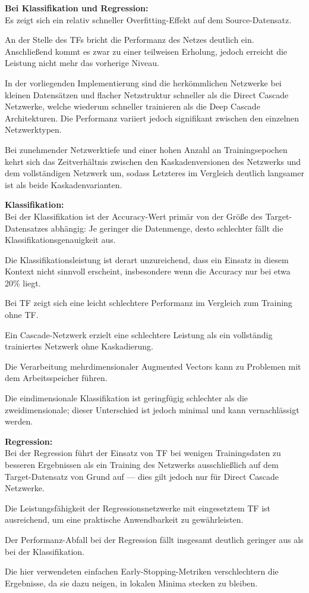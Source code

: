 \textbf{Bei Klassifikation und Regression:}\\
Es zeigt sich ein relativ schneller Overfitting-Effekt auf dem Source-Datensatz.

An der Stelle des TFs bricht die Performanz des Netzes deutlich ein. Anschließend kommt es zwar zu einer teilweisen Erholung, 
jedoch erreicht die Leistung nicht mehr das vorherige Niveau.

In der vorliegenden Implementierung sind die herkömmlichen Netzwerke bei kleinen Datensätzen und flacher Netzstruktur schneller als die Direct 
Cascade Netzwerke, welche wiederum schneller trainieren als die Deep Cascade Architekturen. Die Performanz variiert jedoch signifikant 
zwischen den einzelnen Netzwerktypen. 

Bei zunehmender Netzwerktiefe und einer hohen Anzahl an Trainingsepochen kehrt sich das Zeitverhältnis zwischen den Kaskadenversionen des 
Netzwerks und dem vollständigen Netzwerk um, sodass Letzteres im Vergleich deutlich langsamer ist als beide Kaskadenvarianten.

\textbf{Klassifikation:}\\
Bei der Klassifikation ist der Accuracy-Wert primär von der Größe des Target-Datensatzes abhängig: Je geringer die Datenmenge, desto 
schlechter fällt die Klassifikationsgenauigkeit aus.

Die Klassifikationsleistung ist derart unzureichend, dass ein Einsatz in diesem Kontext nicht sinnvoll erscheint, insbesondere wenn die 
Accuracy nur bei etwa 20\% liegt.

Bei TF zeigt sich eine leicht schlechtere Performanz im Vergleich zum Training ohne TF.

Ein Cascade-Netzwerk erzielt eine schlechtere Leistung als ein vollständig trainiertes Netzwerk ohne Kaskadierung.

Die Verarbeitung mehrdimensionaler Augmented Vectors kann zu Problemen mit dem Arbeitsspeicher führen.

Die eindimensionale Klassifikation ist geringfügig schlechter als die zweidimensionale; dieser Unterschied ist jedoch minimal und kann 
vernachlässigt werden.

\textbf{Regression:}\\
Bei der Regression führt der Einsatz von TF bei wenigen Trainingsdaten zu besseren Ergebnissen als ein Training des Netzwerks ausschließlich 
auf dem Target-Datensatz von Grund auf — dies gilt jedoch nur für Direct Cascade Netzwerke.

Die Leistungsfähigkeit der Regressionsnetzwerke mit eingesetztem TF ist ausreichend, um eine praktische Anwendbarkeit zu gewährleisten.

Der Performanz-Abfall bei der Regression fällt insgesamt deutlich geringer aus als bei der Klassifikation.

Die hier verwendeten einfachen Early-Stopping-Metriken verschlechtern die Ergebnisse, da sie dazu neigen, in lokalen Minima stecken zu bleiben.
